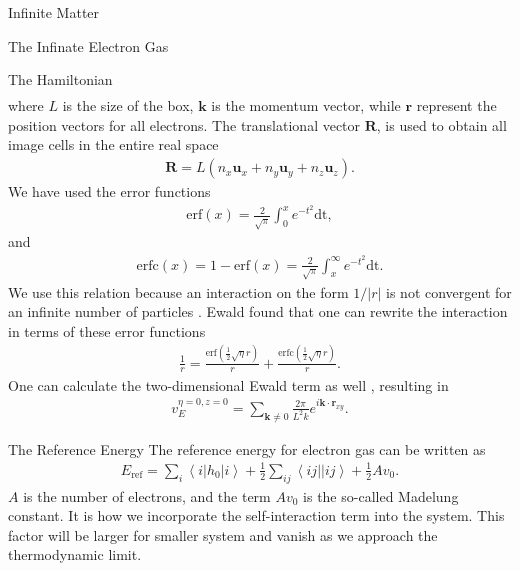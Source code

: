\documentclass[twoside,english]{uiofysmaster}
\begin{document}
\begin{chapter}{Infinite Matter}
\begin{section}{The Infinate Electron Gas}
\begin{subsection}{The Hamiltonian}
\begin{align}
			\end{align}
			where $L$ is the size of the box, $\mathbf{k}$ is the momentum vector, while $\mathbf{r}$ represent the position vectors for all electrons. The translational vector $\mathbf{R}$, is used to obtain all image cells in the entire real space \cite{MHJonline}
			\begin{align}
				\mathbf{R} = L(n_x \mathbf{u}_x + n_y \mathbf{u}_y + n_z \mathbf{u}_z).
			\end{align}
			We have used the error functions
			\begin{align}
				\text{erf}(x) = \frac{2}{\sqrt{\pi}} \int_0^x e^{-t^2} \text{dt},
			\end{align}
			and
			\begin{align}
				\text{erfc}(x) = 1 - \text{erf}(x) = \frac{2}{\sqrt{\pi}} \int_x^\infty e^{-t^2} \text{dt}.
			\end{align}
			We use this relation because an interaction on the form $1/|r|$ is not convergent for an infinite number of particles \cite{Audun}. Ewald found that one can rewrite the interaction in terms of these error functions \cite{Ewald}
			\begin{align}
				\frac{1}{r} = \frac{\text{erf}(\frac{1}{2}\sqrt{\eta}r)}{r} + \frac{\text{erfc}(\frac{1}{2}\sqrt{\eta}r)}{r}.
			\end{align}
			One can calculate the two-dimensional Ewald term as well \cite{Baardsen}, resulting in 
			\begin{align}
				v_E^{\eta=0, z=0} = \sum_{\mathbf{k} \neq 0} \frac{2 \pi}{L^2 k} e^{i \mathbf{k} \cdot \mathbf{r}_{xy}}.
			\end{align}
		\end{subsection}
		
		\begin{subsection}{The Reference Energy}
			The reference energy for electron gas can be written as \cite{Baardsen}
			\begin{align}
				E_{\text{ref}} = \sum_i \left<i | h_0 | i\right> + \frac{1}{2} \sum_{ij} \left<ij||ij\right> + \frac{1}{2} Av_0.
			\end{align}
			$A$ is the number of electrons, and the term $A v_0$ is the so-called Madelung constant. It is how we incorporate the self-interaction term into the system. This factor will be larger for smaller system and vanish as we approach the thermodynamic limit. 
		\end{subsection}
		

\end{section}
\end{chapter}
\end{document}
